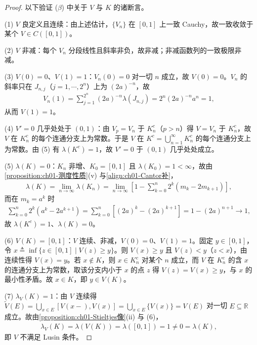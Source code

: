 \documentclass[../../main.tex]{subfiles}%
\begin{document}
\begin{proof}
以下验证 ($\beta$) 中关于 $V$ 与 $K$ 的诸断言。

(1) $V$ 良定义且连续：由上述估计，$\{V_n\}$ 在 $[0,1]$ 上一致 Cauchy，故一致收敛于某个 $V\in C([0,1])$。

(2) $V$ 非减：每个 $V_n$ 分段线性且斜率非负，故非减；非减函数列的一致极限非减。

(3) $V(0)=0$、$V(1)=1$：$V_n(0)=0$ 对一切 $n$ 成立，故 $V(0)=0$。$V_n$ 的斜率只在 $J_{n,j}$（$j=1,\cdots ,2^n$）上为 $(2a)^{-n}$，故
\begin{align*}
V_n(1)=\sum_{j=1}^{2^n}(2a)^{-n}\lambda(J_{n,j})=2^n(2a)^{-n}a^n=1,
\end{align*}
从而 $V(1)=1$。

(4) $V'=0$ 几乎处处于 $(0,1)$：由 $V_p=V_n$ 于 $K_n^c$（$p>n$）得 $V=V_n$ 于 $K_n^c$，故 $V$ 在 $K_n^c$ 的每个连通分支上为常数。于是 $V$ 在 $K^c=\bigcup_{n=1}^\infty K_n^c$ 的每个连通分支上为常数。由 (5) 有 $\lambda(K^c)=1$，故 $V'=0$ 于 $(0,1)$ 几乎处处成立。

(5) $\lambda(K)=0$：$K_n$ 非增、$K_0=[0,1]$ 且 $\lambda(K_0)=1<\infty$，故由\cref{proposition:ch01-测度性质}(v) 与\eqref{align:ch01-Cantor补}，
\begin{align*}
\lambda(K)=\lim_{n\to\infty}\lambda(K_n)=\lim_{n\to\infty}\left[1-\sum_{k=0}^n2^k(m_k-2m_{k+1})\right],
\end{align*}
而在 $m_k=a^k$ 时
\begin{align*}
\sum_{k=0}^n2^k(a^k-2a^{k+1})=\sum_{k=0}^n\left[(2a)^k-(2a)^{k+1}\right]=1-(2a)^{n+1}\longrightarrow1,
\end{align*}
故 $\lambda(K^c)=1$、$\lambda(K)=0$。

(6) $V(K)=[0,1]$：$V$ 连续、非减，$V(0)=0$、$V(1)=1$。固定 $y\in[0,1]$，令 $x\triangleq\inf\{z\in[0,1]\mid V(z)\geqslant y\}$。则 $V(x)\geqslant y$ 且 $V(z)<y$（$z<x$），由连续性得 $V(x)=y$。若 $x\notin K$，则 $x\in K_n^c$ 对某个 $n$ 成立，而 $V$ 在 $K_n^c$ 的含 $x$ 的连通分支上为常数，取该分支内小于 $x$ 的点 $z$ 得 $V(z)=V(x)\geqslant y$，与 $x$ 的最小性矛盾。故 $x\in K$，即 $y\in V(K)$。

(7) $\lambda_V(K)=1$：由 $V$ 连续得 $\widetilde{V}(E)=\bigcup_{x\in E}[V(x-),V(x)]=\bigcup_{x\in E}\{V(x)\}=V(E)$ 对一切 $E\subseteq\mathbb{R}$ 成立。故由\cref{proposition:ch01-Stieltjes像}(ii) 与 (6)，
\begin{align*}
\lambda_V(K)=\lambda(V(K))=\lambda([0,1])=1\neq0=\lambda(K),
\end{align*}
即 $V$ 不满足 Lusin 条件。
\end{proof}
\end{document}

